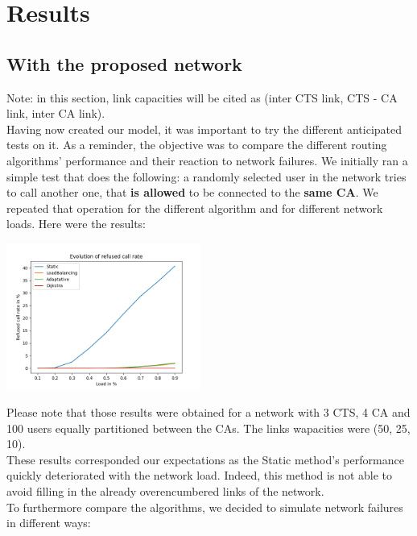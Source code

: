 \documentclass[lettersize,journal]{IEEEtran} %
\begin{document}
\section{Results}
\subsection{With the proposed network}
Note: in this section, link capacities will be cited as (inter CTS link, CTS - CA link, inter CA link).\\
Having now created our model, it was important to try the different anticipated tests on it. As a reminder, the objective was to
compare the different routing algorithms' performance and their reaction to network failures.
We initially ran a simple test that does the following: a randomly selected user in the network tries to call another one, that
\textbf{is allowed} to be connected to the \textbf{same CA}. We repeated that operation for the different algorithm and for different
network loads. Here were the results:
\begin{center}
\includegraphics[width=0.48\textwidth]{call_rate.png}
\end{center}
Please note that those results were obtained for a network with 3 CTS, 4 CA and 100 users equally partitioned between the CAs. The
links wapacities were (50, 25, 10).\\
These results corresponded our expectations as the Static method's performance quickly deteriorated with the network load. Indeed, 
this method is not able to avoid filling in the already overencumbered links of the network.\\
To furthermore compare the algorithms, we decided to simulate network failures in different ways:
\end{document}
